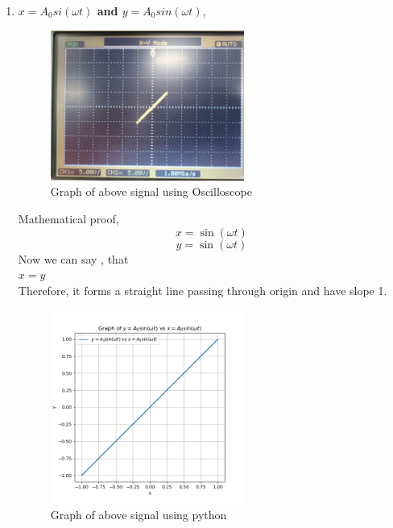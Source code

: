 \begin{enumerate}
\item \textbf{\large \textbf{$x = A_0 si(\omega t)$} and \textbf{$y = A_0 sin(\omega t )$}},
\begin{figure}[h!]
    \centering
    \includegraphics[width=0.6\textwidth]{actualgraph/line.jpeg}
    
    \caption{Graph of above signal using  Oscilloscope}
    \label{fig:sample_image}
    \end{figure}

    Mathematical proof,\\
    \[
    x=\sin(\omega t)
    \]
    \[
    y=\sin(\omega t )
    \]
    Now we can say , that \\
    $x=y$\\
    Therefore, it forms a straight line passing through origin and have slope 1.
    \begin{figure}[h!]
    \centering
    \includegraphics[width=0.6\textwidth]{graphs/Figure_2.png}
    \caption{Graph of above signal using python}
    \label{fig:sample_image}
     \end{figure}






\end{enumerate}
